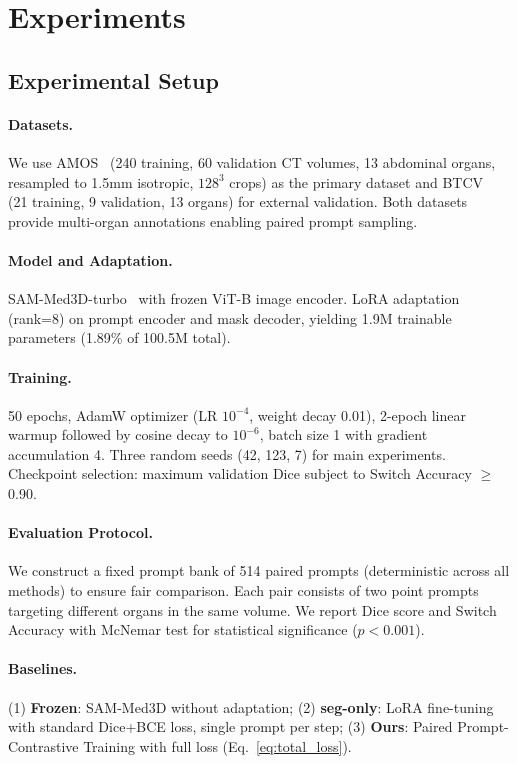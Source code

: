 \section{Experiments}

\subsection{Experimental Setup}

\paragraph{Datasets.} We use AMOS~\citep{ji2022amos} (240 training, 60 validation CT volumes, 13 abdominal organs, resampled to 1.5mm isotropic, $128^3$ crops) as the primary dataset and BTCV~\citep{landman2015btcv} (21 training, 9 validation, 13 organs) for external validation. Both datasets provide multi-organ annotations enabling paired prompt sampling.

\paragraph{Model and Adaptation.} SAM-Med3D-turbo~\citep{wang2023sam_med3d} with frozen ViT-B image encoder. LoRA adaptation (rank=8) on prompt encoder and mask decoder, yielding 1.9M trainable parameters (1.89\% of 100.5M total).

\paragraph{Training.} 50 epochs, AdamW optimizer (LR $10^{-4}$, weight decay 0.01), 2-epoch linear warmup followed by cosine decay to $10^{-6}$, batch size 1 with gradient accumulation 4. Three random seeds (42, 123, 7) for main experiments. Checkpoint selection: maximum validation Dice subject to Switch Accuracy $\geq$ 0.90.

\paragraph{Evaluation Protocol.} We construct a fixed prompt bank of 514 paired prompts (deterministic across all methods) to ensure fair comparison. Each pair consists of two point prompts targeting different organs in the same volume. We report Dice score and Switch Accuracy with McNemar test for statistical significance ($p < 0.001$).

\paragraph{Baselines.} (1) \textbf{Frozen}: SAM-Med3D without adaptation; (2) \textbf{seg-only}: LoRA fine-tuning with standard Dice+BCE loss, single prompt per step; (3) \textbf{Ours}: Paired Prompt-Contrastive Training with full loss (Eq.~\ref{eq:total_loss}).

